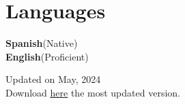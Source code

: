 \documentclass[letterpaper,11pt]{article}
\begin{document}
\section{Languages}
  \begin{itemize}[leftmargin=0.15in, label={}]
    \small{\item{
      \textbf{Spanish}{(Native)} \\
      \textbf{English}{(Proficient)} \\
    }}
 \end{itemize}


\vspace*{\fill}
\begin{center}
  Updated on May, 2024 \\
  Download \href{https://raw.githubusercontent.com/albertolg101/resume/main/resume.pdf}{\underline{here}} the most updated version.
\end{center}
\end{document}
